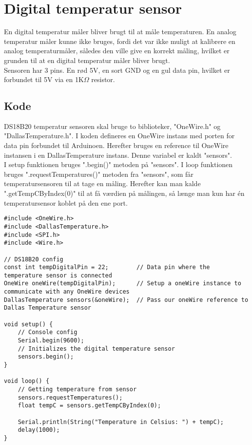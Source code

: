 \section{Digital temperatur sensor}
	En digital temperatur måler bliver brugt til at måle temperaturen. En analog temperatur måler kunne ikke bruges, fordi det var ikke muligt at kalibrere en analog temperaturmåler, således den ville give en korrekt måling, hvilket er grunden til at en digital temperatur måler bliver brugt.\\ [7pt]
	Sensoren har 3 pins. En rød 5V, en sort GND og en gul data pin, hvilket er forbundet til 5V via en 1K$\Omega$ resistor.
	\subsection{Kode}
		DS18B20 temperatur sensoren skal bruge to biblioteker, "OneWire.h" og "DallasTemperature.h". I koden defineres en OneWire instans med porten for data pin forbundet til Arduinoen. Herefter bruges en reference til OneWire instansen i en DallasTemperature instans. Denne variabel er kaldt "sensors". \\ [7pt]
		I setup funktionen bruges ".begin()"{} metoden på "sensors". I loop funktionen bruges ".requestTemperatures()"{} metoden fra "sensors", som får temperatursensoren til at tage en måling. Herefter kan man kalde ".getTempCByIndex(0)"{} til at få værdien på målingen, så længe man kun har én temperatursensor koblet på den ene port. 
		\begin{lstlisting}
#include <OneWire.h>
#include <DallasTemperature.h>
#include <SPI.h>
#include <Wire.h>

// DS18B20 config
const int tempDigitalPin = 22;        // Data pin where the temperature sensor is connected
OneWire oneWire(tempDigitalPin);      // Setup a oneWire instance to communicate with any OneWire devices
DallasTemperature sensors(&oneWire);  // Pass our oneWire reference to Dallas Temperature sensor

void setup() {
	// Console config
	Serial.begin(9600);
	// Initializes the digital temperature sensor
	sensors.begin();
}

void loop() {
	// Getting temperature from sensor
	sensors.requestTemperatures();
	float tempC = sensors.getTempCByIndex(0);
	
	Serial.println(String("Temperature in Celsius: ") + tempC);
	delay(1000);
}
		\end{lstlisting}